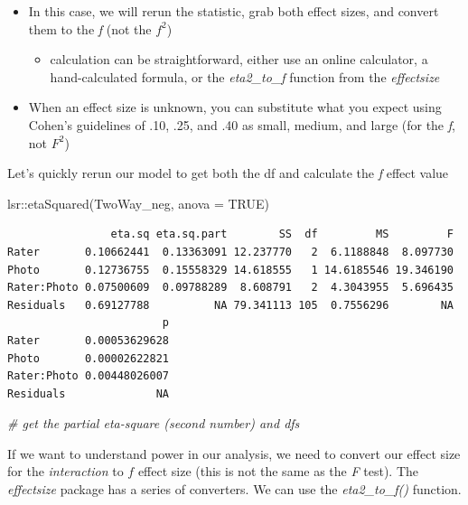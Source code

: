 \documentclass[
  11pt,
]{book}
\newenvironment{Shaded}{\begin{snugshade}}{\end{snugshade}}
\newcommand{\AttributeTok}[1]{\textcolor[rgb]{0.77,0.63,0.00}{#1}}
\newcommand{\CommentTok}[1]{\textcolor[rgb]{0.56,0.35,0.01}{\textit{#1}}}
\newcommand{\ConstantTok}[1]{\textcolor[rgb]{0.00,0.00,0.00}{#1}}
\newcommand{\FunctionTok}[1]{\textcolor[rgb]{0.00,0.00,0.00}{#1}}
\newcommand{\NormalTok}[1]{#1}
\newcommand{\SpecialCharTok}[1]{\textcolor[rgb]{0.00,0.00,0.00}{#1}}
\providecommand{\tightlist}{%
  \setlength{\itemsep}{0pt}\setlength{\parskip}{0pt}}
\begin{document}
\begin{itemize}
\tightlist
\item
  In this case, we will rerun the statistic, grab both effect sizes, and convert them to the \emph{f} (not the \(f^2\))

  \begin{itemize}
  \tightlist
  \item
    calculation can be straightforward, either use an online calculator, a hand-calculated formula, or the \emph{eta2\_to\_f} function from the \emph{effectsize}
  \end{itemize}
\item
  When an effect size is unknown, you can substitute what you expect using Cohen's guidelines of .10, .25, and .40 as small, medium, and large (for the \emph{f}, not \(F^2\))
\end{itemize}

Let's quickly rerun our model to get both the df and calculate the \emph{f} effect value

\begin{Shaded}
\begin{Highlighting}[]
\NormalTok{lsr}\SpecialCharTok{::}\FunctionTok{etaSquared}\NormalTok{(TwoWay\_neg, }\AttributeTok{anova =} \ConstantTok{TRUE}\NormalTok{)}
\end{Highlighting}
\end{Shaded}

\begin{verbatim}
                eta.sq eta.sq.part        SS  df         MS         F
Rater       0.10662441  0.13363091 12.237770   2  6.1188848  8.097730
Photo       0.12736755  0.15558329 14.618555   1 14.6185546 19.346190
Rater:Photo 0.07500609  0.09788289  8.608791   2  4.3043955  5.696435
Residuals   0.69127788          NA 79.341113 105  0.7556296        NA
                        p
Rater       0.00053629628
Photo       0.00002622821
Rater:Photo 0.00448026007
Residuals              NA
\end{verbatim}

\begin{Shaded}
\begin{Highlighting}[]
\CommentTok{\# get the partial eta{-}square (second number) and dfs}
\end{Highlighting}
\end{Shaded}

If we want to understand power in our analysis, we need to convert our effect size for the \emph{interaction} to \(f\) effect size (this is not the same as the \emph{F} test). The \emph{effectsize} package has a series of converters. We can use the \emph{eta2\_to\_f()} function.
\end{document}
